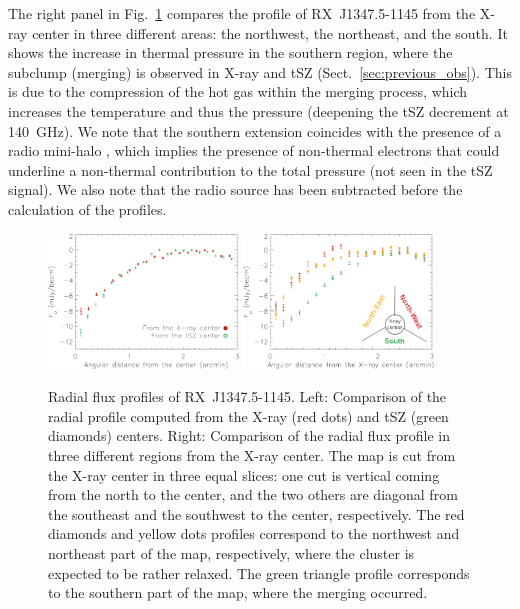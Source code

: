 The right panel in Fig.~\ref{fig:profiles} compares the profile of \mbox{RX~J1347.5-1145} from the \mbox{X-ray} center in three different areas: the northwest, the northeast, and the south. It shows the increase in thermal pressure in the southern region, where the subclump (merging) is observed in \mbox{X-ray} and tSZ (Sect.~\ref{sec:previous_obs}). This is due to the compression of the hot gas within the merging process, which increases the temperature and thus the pressure (deepening the tSZ decrement at 140~GHz). We note that the southern extension coincides with the presence of a radio mini-halo \citep[see the work by][]{gitti_2007_bis}, which implies the presence of non-thermal electrons that could underline a non-thermal contribution to the total pressure (not seen in the tSZ signal). We also note that the radio source has been subtracted before the calculation of the profiles.
	\begin{figure}
	\centering
	\includegraphics[width=0.45\textwidth]{Figure/profile_SZvsX}
	\hspace*{0.5cm}
	\includegraphics[width=0.45\textwidth]{Figure/profile_pie}
	\caption{Radial flux profiles of \mbox{RX~J1347.5-1145}. Left: Comparison of the radial profile computed from the \mbox{X-ray} (red dots) and tSZ (green diamonds) centers. Right: Comparison of the radial flux profile in three different regions from the \mbox{X-ray} center. The map is cut from the \mbox{X-ray} center in three equal slices: one cut is vertical coming from the north to the center, and the two others are diagonal from the southeast and the southwest to the center, respectively. The red diamonds and yellow dots profiles correspond to the northwest and northeast part of the map, respectively, where the cluster is expected to be rather relaxed. The green triangle profile corresponds to the southern part of the map, where the merging occurred.}
        \label{fig:profiles}
	\end{figure}

